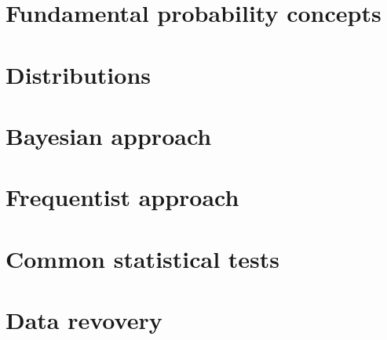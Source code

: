 \section{Fundamental probability concepts}


\section{Distributions}


\section{Bayesian approach}


\section{Frequentist approach}


\section{Common statistical tests}


\section{Data revovery}

